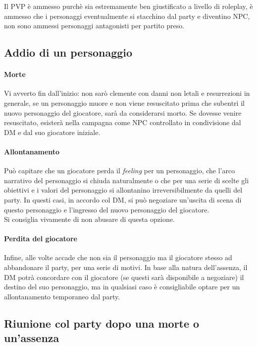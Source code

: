 Il PVP è ammesso purchè sia estremamente ben giustificato a livello di roleplay, è ammesso che i personaggi eventualmente si stacchino dal party e diventino NPC, non sono ammessi personaggi antagonisti per partito preso.

\subsection{Addio di un personaggio}

\paragraph{Morte}

Vi avverto fin dall'inizio: non sarò clemente con danni non letali e resurrezioni in generale, se un personaggio muore e non viene resuscitato prima che subentri il nuovo personaggio del giocatore, sarà da considerarsi morto. Se dovesse venire resuscitato, esisterà nella campagna come NPC controllato in condivisione dal DM e dal suo giocatore iniziale.

\paragraph{Allontanamento}

Può capitare che un giocatore perda il \textit{feeling} per un personaggio, che l'arco narrativo del personaggio si chiuda naturalmente o che per una serie di scelte gli obiettivi e i valori del personaggio si allontanino irreversibilmente da quelli del party. In questi casi, in accordo col DM, si può negoziare un'uscita di scena di questo personaggio e l'ingresso del nuovo personaggio del giocatore.\\ Si consiglia vivamente di non abusare di questa opzione.

\paragraph{Perdita del giocatore}

Infine, alle volte accade che non sia il personaggio ma il giocatore stesso ad abbandonare il party, per una serie di motivi. In base alla natura dell'assenza, il DM potrà concordare con il giocatore (se questi sarà disponibile a negoziare) il destino del suo personaggio, ma in qualsiasi caso è consigliabile optare per un allontanamento temporaneo dal party.

\subsection{Riunione col party dopo una morte o un'assenza}

